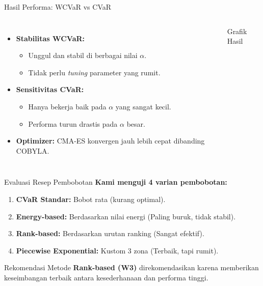 \documentclass[10pt]{beamer}
\begin{document}
\begin{frame}{Hasil Performa: WCVaR vs CVaR}
    \begin{columns}
        \begin{itemize}
            \item \textbf{Stabilitas WCVaR:}
            \begin{itemize}
                \item Unggul dan stabil di berbagai nilai $\alpha$.
                \item Tidak perlu \textit{tuning} parameter yang rumit.
            \end{itemize}
            \item \textbf{Sensitivitas CVaR:}
            \begin{itemize}
                \item Hanya bekerja baik pada $\alpha$ yang sangat kecil.
                \item Performa turun drastis pada $\alpha$ besar.
            \end{itemize}
            \item \textbf{Optimizer:} CMA-ES konvergen jauh lebih cepat dibanding COBYLA.
        \end{itemize}
        
        \begin{alertblock}{Grafik Hasil}
        \end{alertblock}
    \end{columns}
\end{frame}

\begin{frame}{Evaluasi Resep Pembobotan}
    \textbf{Kami menguji 4 varian pembobotan:}
    \begin{enumerate}
        \item \textbf{CVaR Standar:} Bobot rata (kurang optimal).
        \item \textbf{Energy-based:} Berdasarkan nilai energi (Paling buruk, tidak stabil).
        \item \textbf{Rank-based:} Berdasarkan urutan ranking (Sangat efektif).
        \item \textbf{Piecewise Exponential:} Kustom 3 zona (Terbaik, tapi rumit).
    \end{enumerate}
    
    \vspace{0.5cm}
    \begin{block}{Rekomendasi}
        Metode \textbf{Rank-based (W3)} direkomendasikan karena memberikan keseimbangan terbaik antara kesederhanaan dan performa tinggi.
    \end{block}
\end{frame}
\end{document}
